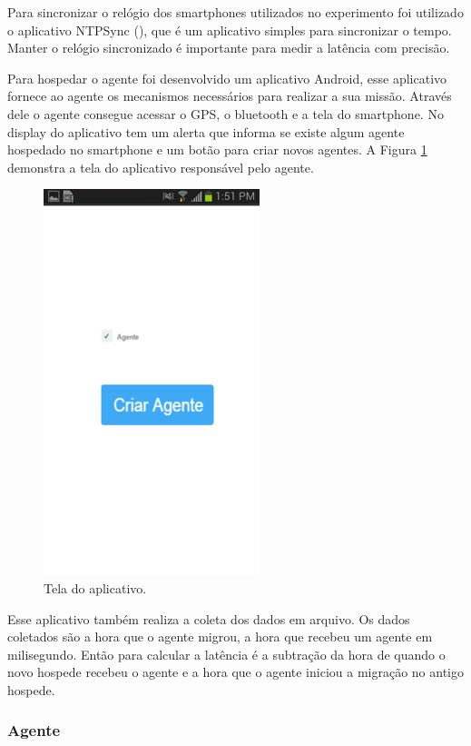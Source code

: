 Para sincronizar o relógio dos smartphones utilizados no experimento foi utilizado o aplicativo NTPSync (\cite{Ntpsync:2015}), que é um aplicativo simples para sincronizar o tempo. Manter o relógio sincronizado é importante para medir a latência com precisão. 


Para hospedar o agente foi desenvolvido um aplicativo Android, esse aplicativo fornece ao agente os mecanismos necessários para realizar a sua missão. Através dele o agente consegue acessar o GPS, o bluetooth e a tela do smartphone. No display do aplicativo tem um alerta que informa se existe algum agente hospedado no smartphone e um botão para criar novos agentes. A Figura \ref{fig:appScreen} demonstra a tela do aplicativo responsável pelo agente.

\begin{figure}[htbp]
	\centering
	\includegraphics[scale=0.5]{metodologia/figuras/appScreen.jpg}
	\caption{Tela do aplicativo.}
	\label{fig:appScreen}
\end{figure}

Esse aplicativo também realiza a coleta dos dados em arquivo. Os dados coletados são a hora que o agente migrou, a hora que recebeu um agente em milisegundo. Então para calcular a latência é a subtração da hora de quando o novo hospede recebeu o agente e a hora que o agente iniciou a migração no antigo hospede.

\subsubsection{Agente}

